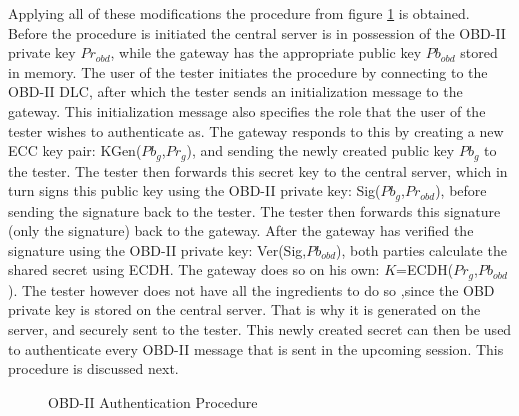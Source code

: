 Applying all of these modifications the procedure from figure \ref{fig:authentication_procedure} is obtained. Before the procedure is initiated the central server is in possession of the OBD-II private key $Pr_{obd}$, while the gateway has the appropriate public key $Pb_{obd}$ stored in memory. The user of the tester initiates the procedure by connecting to the OBD-II DLC, after which the tester sends an initialization message to the gateway. This initialization message also specifies the role that the user of the tester wishes to authenticate as. The gateway responds to this by creating a new ECC key pair: KGen($Pb_g$,$Pr_g$), and sending the newly created public key $Pb_g$ to the tester. The tester then forwards this secret key to the central server, which in turn signs this public key using the OBD-II private key: Sig($Pb_g$,$Pr_{obd}$), before sending the signature back to the tester. The tester then forwards this signature (only the signature) back to the gateway. After the gateway has verified the signature using the OBD-II private key: Ver(Sig,$Pb_{obd}$), both parties calculate the shared secret using ECDH. The gateway does so on his own: $K$=ECDH($Pr_g$,$Pb_{obd}$). The tester however does not have all the ingredients to do so ,since the OBD private key is stored on the central server. That is why it is generated on the server, and securely sent to the tester. This newly created secret can then be used to authenticate every OBD-II message that is sent in the upcoming session. This procedure is discussed next.
 
\begin{figure}[h]
	\centering
	\caption{OBD-II Authentication Procedure}
	\label{fig:authentication_procedure}
\end{figure}

